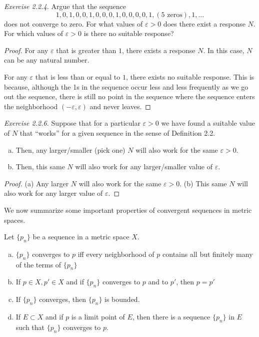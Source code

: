 \noindent
\emph{Exercise 2.2.4.} Argue that the sequence $$1,0,1,0,0,1,0,0,0,1,0,0,0,0,1,(\text{5 zeros}),1,...$$
does not converge to zero. For what values of $\varepsilon > 0$ does there exist a response $N$. For which values of $\varepsilon > 0$ is there no suitable response?

\begin{proof}
For any $\varepsilon$ that is greater than $1$, there exists a response $N$. In this case, $N$ can be any natural number.

For any $\varepsilon$ that is less than or equal to $1$, there exists no suitable response. This is because, although the 1s in the sequence occur less and less frequently as we go out the sequence, there is still no point in the sequence where the sequence enters the neighborhood $(-\varepsilon, \varepsilon)$ and never leaves.

\end{proof}


\emph{Exercise 2.2.6.} Suppose that for a particular $\varepsilon > 0$ we have found a suitable value of $N$ that ``works'' for a given sequence in the sense of Definition 2.2.
\begin{enumerate}[(a)]	
\item Then, any larger/smaller (pick one) $N$ will also work for the same $\varepsilon > 0$. 
\item Then, this same $N$ will also work for any larger/smaller value of $\varepsilon$.
\end{enumerate}

\begin{proof}
(a) Any larger $N$ will also work for the same $\varepsilon > 0$. (b) This same $N$ will also work for any larger value of $\varepsilon$.
\end{proof}

We now summarize some important properties of convergent sequences in metric spaces.

\begin{theorem}  Let $\{p_n\}$ be a sequence in a metric space $X$.
\begin{enumerate}[(a)]
	\item $\{p_n\}$  converges to $p$ iff every neighborhood of $p$ contains all but finitely many of the terms of $\{p_n\}$
	\item If $p \in X, p' \in X$ and if $\{p_n\}$ converges to $p$ and to $p'$, then $ p=p'$
	\item If $\{p_n\}$ converges, then $\{p_n\}$ is bounded.
	\item If $E \subset X$ and if $p$ is a limit point of $E$, then there is a sequence $\{p_n\}$ in $E$ such that $\{p_n\}$ converges to $p$.
\end{enumerate}
\end{theorem}


